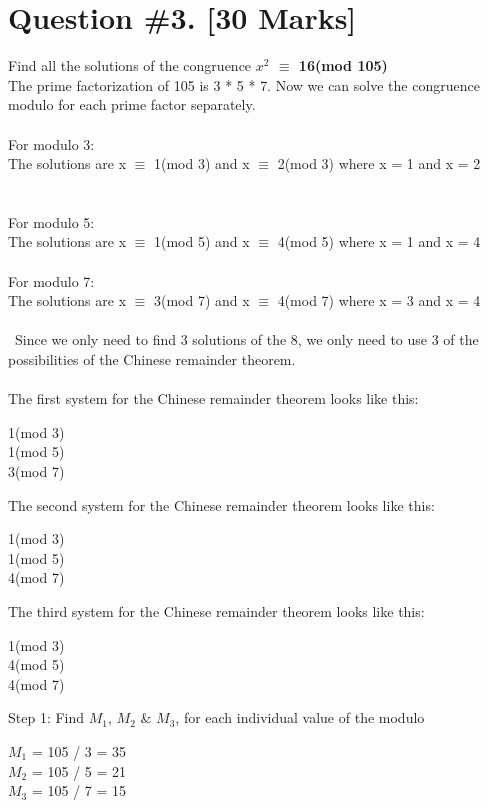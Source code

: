 \documentclass{article}
\begin{document}
\section{Question \#3. [30 Marks]}
Find all the solutions of the congruence \textbf{ $x^2$ $\equiv$ 16(mod 105)} \\ 
The prime factorization of 105 is 3 * 5 * 7. Now we can solve the congruence modulo for each prime factor separately. \\\\
For modulo 3: \\
The solutions are x $\equiv$ 1(mod 3) and x $\equiv$ 2(mod 3) where x = 1 and x = 2 \\\\\\
For modulo 5: \\ 
The solutions are x $\equiv$ 1(mod 5) and x $\equiv$ 4(mod 5) where x = 1 and x = 4 \\\\
For modulo 7: \\ 
The solutions are x $\equiv$ 3(mod 7) and x $\equiv$ 4(mod 7) where x = 3 and x = 4 \\\\\
Since we only need to find 3 solutions of the 8, we only need to use 3 of the possibilities of the Chinese remainder theorem. \\\\
The first system for the Chinese remainder theorem looks like this:  
\begin{center}
1(mod 3)\\
1(mod 5) \\
3(mod 7) \\
\end{center}
The second system for the Chinese remainder theorem looks like this:  
\begin{center}
1(mod 3)\\
1(mod 5) \\
4(mod 7) \\
\end{center}
The third system for the Chinese remainder theorem looks like this:  
\begin{center}
1(mod 3)\\
4(mod 5) \\
4(mod 7) \\
\end{center} 
Step 1: Find $M_{1}$, $M_{2}$ \& $M_{3}$, for each individual value of the modulo
\begin{center}
$M_{1}$ = 105 / 3 = 35 \\
$M_{2}$ = 105 / 5 = 21 \\
$M_{3}$ = 105 / 7 = 15
\end{center}
\end{document}
